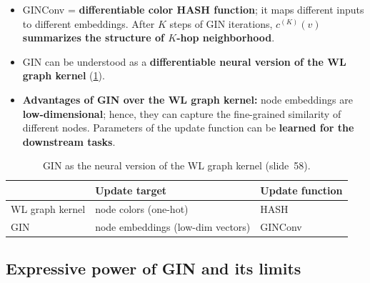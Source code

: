\begin{itemize}
  \item[] GINConv = \textbf{differentiable color HASH function}; it maps
    different inputs to different embeddings. After $K$ steps of GIN iterations,
    $c^{(K)}(v)$ \textbf{summarizes the structure of $K$-hop neighborhood}.
  \item GIN can be understood as a \textbf{differentiable neural version of the WL
    graph kernel} (\cref{tab:lec06-wlgin}).
  \item \textbf{Advantages of GIN over the WL graph kernel:} node embeddings are
    \textbf{low-dimensional}; hence, they can capture the fine-grained similarity
    of different nodes. Parameters of the update function can be \textbf{learned
    for the downstream tasks}.
\end{itemize}

\begin{table}[htbp]
  \centering\small
  \caption{GIN as the neural version of the WL graph kernel (slide~58).}
  \label{tab:lec06-wlgin}
  \begin{tabular}{@{}lll@{}}
    \toprule
    & Update target & Update function\\
    \midrule
    WL graph kernel & node colors (one-hot) & HASH\\
    GIN & node embeddings (low-dim vectors) & GINConv\\
    \bottomrule
  \end{tabular}
\end{table}

\subsection{Expressive power of GIN and its limits}\label{sec:lec06-limits}

